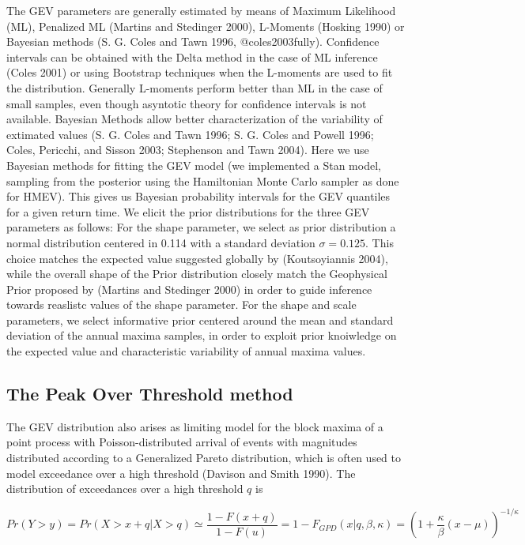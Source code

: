 \documentclass[]{article}
\begin{document}
The GEV parameters are generally estimated by means of Maximum
Likelihood (ML), Penalized ML (Martins and Stedinger 2000), L-Moments
(Hosking 1990) or Bayesian methods (S. G. Coles and Tawn 1996,
@coles2003fully). Confidence intervals can be obtained with the Delta
method in the case of ML inference (Coles 2001) or using Bootstrap
techniques when the L-moments are used to fit the distribution.
Generally L-moments perform better than ML in the case of small samples,
even though asyntotic theory for confidence intervals is not available.
Bayesian Methods allow better characterization of the variability of
extimated values (S. G. Coles and Tawn 1996; S. G. Coles and Powell
1996; Coles, Pericchi, and Sisson 2003; Stephenson and Tawn 2004). Here
we use Bayesian methods for fitting the GEV model (we implemented a Stan
model, sampling from the posterior using the Hamiltonian Monte Carlo
sampler as done for HMEV). This gives us Bayesian probability intervals
for the GEV quantiles for a given return time. We elicit the prior
distributions for the three GEV parameters as follows: For the shape
parameter, we select as prior distribution a normal distribution
centered in 0.114 with a standard deviation \(\sigma = 0.125\). This
choice matches the expected value suggested globally by (Koutsoyiannis
2004), while the overall shape of the Prior distribution closely match
the Geophysical Prior proposed by (Martins and Stedinger 2000) in order
to guide inference towards reaslistc values of the shape parameter. For
the shape and scale parameters, we select informative prior centered
around the mean and standard deviation of the annual maxima samples, in
order to exploit prior knoiwledge on the expected value and
characteristic variability of annual maxima values.

\hypertarget{the-peak-over-threshold-method}{%
\subsection{The Peak Over Threshold
method}\label{the-peak-over-threshold-method}}

The GEV distribution also arises as limiting model for the block maxima
of a point process with Poisson-distributed arrival of events with
magnitudes distributed according to a Generalized Pareto distribution,
which is often used to model exceedance over a high threshold (Davison
and Smith 1990). The distribution of exceedances over a high threshold
\(q\) is

\begin{equation}
    Pr \left( Y > y\right) = Pr \left( X > x + q \lvert X > q\right) \simeq
    \frac{1 - F(x + q)}{1 - F(u)} = 1 - F_{GPD} \left( x \lvert q, \beta,
    \kappa \right)
    = \left(
    1 + \frac{\kappa}{\beta}\left( x - \mu \right)\right)^{-1/\kappa}
\end{equation}
\end{document}
